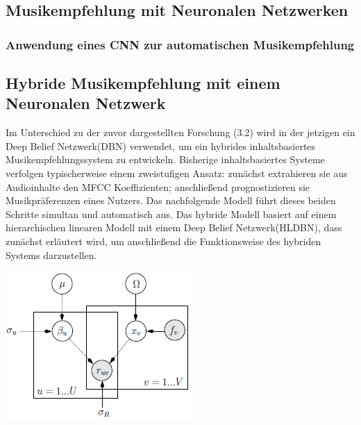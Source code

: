 \documentclass[twosided,a4,10pt]{article}
\begin{document}
\begin{multicols}{2}
		\subsection{Musikempfehlung mit Neuronalen Netzwerken}
		\subsubsection*{Anwendung eines CNN zur automatischen Musikempfehlung}
		\subsection{Hybride Musikempfehlung mit einem Neuronalen Netzwerk}
		Im Unterschied zu der zuvor dargestellten Forschung (3.2) wird in der jetzigen ein Deep Belief Netzwerk(DBN) verwendet, um ein hybrides inhaltsbasiertes Musikempfehlungssystem zu entwickeln. Bisherige inhaltsbasiertes Systeme verfolgen typischerweise einem zweistufigen Ansatz: zunächst extrahieren sie aus Audioinhalte den MFCC Koeffizienten; anschließend prognostizieren sie Musikpräferenzen eines Nutzers. Das nachfolgende Modell führt dieses beiden Schritte simultan und automatisch aus. \cite{wang}\newline
		Das hybride Modell basiert auf einem hierarchischen linearen Modell mit einem Deep Belief Netzwerk(HLDBN), dass zunächst erläutert wird, um anschließend die Funktionsweise des hybriden Systems darzustellen.
		\begin{minipage}{0.45\textwidth}
			\centering
			\includegraphics{img/hlmdbn.png}
			\label{img:hlmdbn}
		\end{minipage}

\end{multicols}
\end{document}
